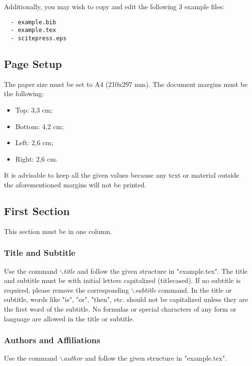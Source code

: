 \documentclass[a4paper,twoside]{article}
\begin{document}
 Additionally, you may wish to copy and edit
the following 3 example files:
\begin{verbatim}
  - example.bib
  - example.tex
  - scitepress.eps
\end{verbatim}


\subsection{Page Setup}

The paper size must be set to A4 (210x297 mm). The document
margins must be the following:

\begin{itemize}
    \item Top: 3,3 cm;
    \item Bottom: 4,2 cm;
    \item Left: 2,6 cm;
    \item Right: 2,6 cm.
\end{itemize}

It is advisable to keep all the given values because any text or
material outside the aforementioned margins will not be printed.

\subsection{First Section}

This section must be in one column.

\subsubsection{Title and Subtitle}

Use the command \textit{$\backslash$title} and follow the given structure in "example.tex". The title and subtitle must be with initial letters
capitalized (titlecased). If no subtitle is required, please remove the corresponding \textit{$\backslash$subtitle} command. In the title or subtitle, words like "is", "or", "then", etc. should not be capitalized unless they are the first word of the subtitle. No formulas or special characters of any form or language are allowed in the title or subtitle.

\subsubsection{Authors and Affiliations}

Use the command \textit{$\backslash$author} and follow the given structure in "example.tex".
\end{document}
